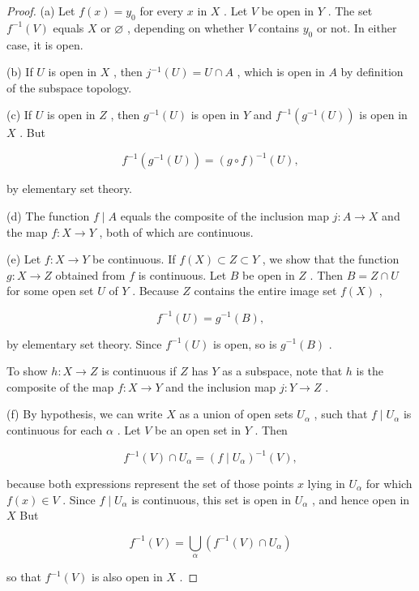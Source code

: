 \begin{proof}
(a) Let \(f\left( x\right)  = {y}_{0}\) for every \(x\) in \(X\) . Let \(V\) be open in \(Y\) . The set \({f}^{-1}\left( V\right)\) equals \(X\) or \(\varnothing\) , depending on whether \(V\) contains \({y}_{0}\) or not. In either case, it is open.

(b) If \(U\) is open in \(X\) , then \({j}^{-1}\left( U\right)  = U \cap  A\) , which is open in \(A\) by definition of the subspace topology.

(c) If \(U\) is open in \(Z\) , then \({g}^{-1}\left( U\right)\) is open in \(Y\) and \({f}^{-1}\left( {{g}^{-1}\left( U\right) }\right)\) is open in \(X\) . But

\[
{f}^{-1}\left( {{g}^{-1}\left( U\right) }\right)  = {\left( g \circ  f\right) }^{-1}\left( U\right) ,
\]

by elementary set theory.

(d) The function \(f \mid  A\) equals the composite of the inclusion map \(j : A \rightarrow  X\) and the map \(f : X \rightarrow  Y\) , both of which are continuous.

(e) Let \(f : X \rightarrow  Y\) be continuous. If \(f\left( X\right)  \subset  Z \subset  Y\) , we show that the function \(g : X \rightarrow  Z\) obtained from \(f\) is continuous. Let \(B\) be open in \(Z\) . Then \(B = Z \cap  U\) for some open set \(U\) of \(Y\) . Because \(Z\) contains the entire image set \(f\left( X\right)\) ,

\[
{f}^{-1}\left( U\right)  = {g}^{-1}\left( B\right) ,
\]

by elementary set theory. Since \({f}^{-1}\left( U\right)\) is open, so is \({g}^{-1}\left( B\right)\) .

To show \(h : X \rightarrow  Z\) is continuous if \(Z\) has \(Y\) as a subspace, note that \(h\) is the composite of the map \(f : X \rightarrow  Y\) and the inclusion map \(j : Y \rightarrow  Z\) .

(f) By hypothesis, we can write \(X\) as a union of open sets \({U}_{\alpha }\) , such that \(f \mid  {U}_{\alpha }\) is continuous for each \(\alpha\) . Let \(V\) be an open set in \(Y\) . Then

\[
{f}^{-1}\left( V\right)  \cap  {U}_{\alpha } = {\left( f \mid  {U}_{\alpha }\right) }^{-1}\left( V\right) ,
\]

because both expressions represent the set of those points \(x\) lying in \({U}_{\alpha }\) for which \(f\left( x\right)  \in  V\) . Since \(f \mid  {U}_{\alpha }\) is continuous, this set is open in \({U}_{\alpha }\) , and hence open in \(X\) But

\[
{f}^{-1}\left( V\right)  = \mathop{\bigcup }\limits_{\alpha }\left( {{f}^{-1}\left( V\right)  \cap  {U}_{\alpha }}\right)
\]

so that \({f}^{-1}\left( V\right)\) is also open in \(X\) .
\end{proof}

